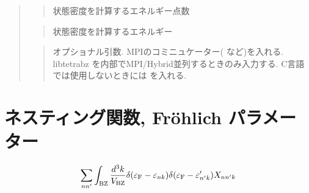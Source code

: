\documentclass[letterpaper,10pt,dvipdfmx,openany]{sphinxmanual}
\begin{document}
\begin{quote}
\begin{quote}
\sphinxAtStartPar
状態密度を計算するエネルギー点数
\end{quote}

\begin{sphinxVerbatim}[commandchars=\\\{\}]
\end{sphinxVerbatim}
\begin{quote}

\sphinxAtStartPar
状態密度を計算するエネルギー
\end{quote}

\begin{sphinxVerbatim}[commandchars=\\\{\}]
\end{sphinxVerbatim}
\begin{quote}

\sphinxAtStartPar
オプショナル引数.
MPIのコミニュケーター(  など)を入れる.
libtetrabz を内部でMPI/Hybrid並列するときのみ入力する.
C言語では使用しないときには  を入れる.
\end{quote}
\end{quote}


\section{ネスティング関数, Fröhlich パラメーター}
\label{\detokenize{routine:frohlich}}\begin{equation*}
\begin{split}\begin{align}
\sum_{n n'}
\int_{\rm BZ} \frac{d^3 k}{V_{\rm BZ}}
\delta(\varepsilon_{\rm F} -
\varepsilon_{n k}) \delta(\varepsilon_{\rm F} - \varepsilon'_{n' k})
X_{n n' k}
\end{align}\end{split}
\end{equation*}
\begin{sphinxVerbatim}[commandchars=\\\{\}]
\end{sphinxVerbatim}
\end{document}
